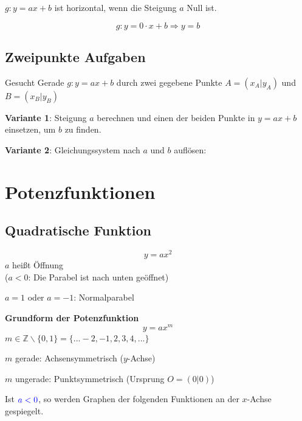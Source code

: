 \begin{multicols}{2}
$g: y=ax+b$ ist horizontal, wenn die Steigung $a$ Null ist.

$$g:  y=0\cdot{}x+b \Rightarrow y=b$$

\subsection*{Zweipunkte Aufgaben}
Gesucht Gerade $g: y=ax+b$ durch zwei gegebene Punkte $A=(x_A|y_A)$
und $B=(x_B|y_B)$

\textbf{Variante 1}: Steigung $a$ berechnen und einen der beiden Punkte in
$y=ax+b$ einsetzen, um $b$ zu finden.

\textbf{Variante 2}: Gleichungssystem nach $a$ und $b$ auf\/lösen:


\forceCB
\section*{Potenzfunktionen}

\subsection*{Quadratische Funktion}
$$y=ax^2$$
$a$ heißt Öffnung\\
($a<0$: Die Parabel ist nach unten geöffnet)

$a=1$ oder $a=-1$: Normalparabel
\vspace*{\fill}

\begin{tcolorbox}[colback=white]
  \textbf{Grundform der Potenzfunktion}
$$y=ax^m$$
$m\in\mathbb{Z}\backslash\{0,1\} = \{...-2, -1, 2, 3, 4, ...\}$
\end{tcolorbox}

$m$ gerade: Achsensymmetrisch ($y$-Achse)

$m$ ungerade: Punktsymmetrisch (Ursprung $O=(0|0)$)


Ist ${\color{blue}a<0}$, so werden Graphen der folgenden Funktionen an der $x$-Achse gespiegelt.

\end{multicols}

